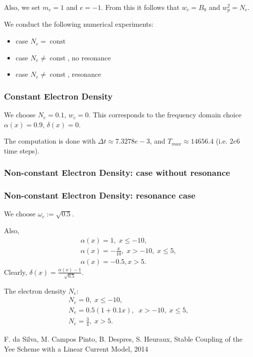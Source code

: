 \documentclass[a4paper,10pt]{article}
\begin{document}
Also, we set $m_e=1$ and $e=-1$. From this it follows that $w_c=B_0$ and $w_p^2=N_e$. 

We conduct the following numerical experiments:
\begin{itemize}
 \item case $N_e=\operatorname{const}$
 \item case $N_e\neq \operatorname{const}$, no resonance
 \item case $N_e\neq \operatorname{const}$, resonance
\end{itemize}


\subsubsection{Constant Electron Density}
We choose $N_e=0.1$, $w_c=0$. This corresponds to the frequency domain choice $\alpha(x)=0.9$, $\delta(x)=0$. 

The computation is done with $\Delta t\approx 7.3278e-3$, 
and $T_{max}\approx 14656.4$ (i.e. $2e6$ time steps).








\subsubsection{Non-constant Electron Density: case without resonance}

\subsubsection{Non-constant Electron Density: resonance case}
We choose $\omega_c:=\sqrt{0.5}$.

Also, 
\begin{align*}
\alpha(x)=1,\; x\leq -10,\\
\alpha(x)=-\frac{x}{10}, \; x>-10,\; x\leq 5,\\
\alpha(x)=-0.5, x>5.
\end{align*}
Clearly, $\delta(x)=\frac{\alpha(x)-1}{\sqrt{0.5}}$.

The electron density $N_e$:
\begin{align*}
 N_e=0,\; x\leq -10,\\
 N_e=0.5(1+0.1x),\;  \; x>-10,\; x\leq 5,\\
 N_e=\frac{3}{4},\; x>5.
\end{align*}






\begin{thebibliography}{99}
 F. da Silva, M. Campos Pinto, B. Despres, S. Heuraux, Stable Coupling of the Yee Scheme with a Linear Current Model,
2014
\end{thebibliography}
\end{document}
